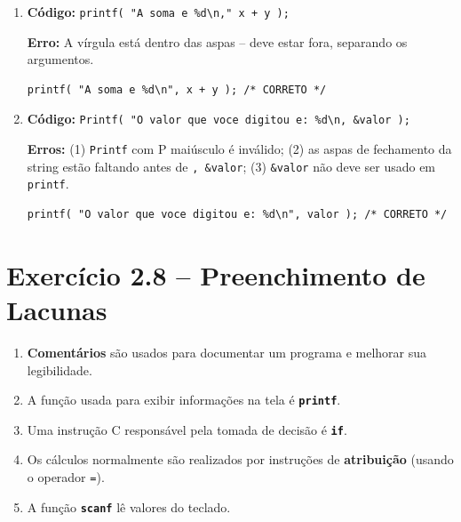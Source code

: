 \documentclass[12pt,a4paper]{article}
\begin{document}
\begin{respostabox}
\begin{enumerate}[label=\textbf{\alph*)}]
\item \textbf{Código:} \texttt{printf( "A soma e \%d\textbackslash n," x + y );}

\textbf{Erro:} A vírgula está dentro das aspas -- deve estar fora, separando os argumentos.
\begin{lstlisting}
printf( "A soma e %d\n", x + y ); /* CORRETO */
\end{lstlisting}

\item \textbf{Código:} \texttt{Printf( "O valor que voce digitou e: \%d\textbackslash n, \&valor );}

\textbf{Erros:} (1) \texttt{Printf} com P maiúsculo é inválido; (2) as aspas de fechamento da string estão faltando antes de \texttt{, \&valor}; (3) \texttt{\&valor} não deve ser usado em \texttt{printf}.
\begin{lstlisting}
printf( "O valor que voce digitou e: %d\n", valor ); /* CORRETO */
\end{lstlisting}

\end{enumerate}
\end{respostabox}

\section{Exercício 2.8 -- Preenchimento de Lacunas}

\begin{respostabox}[title={Exercício 2.8 -- Respostas}]
\begin{enumerate}[label=\textbf{\alph*)}]
  \item \textbf{Comentários} são usados para documentar um programa e melhorar sua legibilidade.
  \item A função usada para exibir informações na tela é \textbf{\texttt{printf}}.
  \item Uma instrução C responsável pela tomada de decisão é \textbf{\texttt{if}}.
  \item Os cálculos normalmente são realizados por instruções de \textbf{atribuição} (usando o operador \texttt{=}).
  \item A função \textbf{\texttt{scanf}} lê valores do teclado.
\end{enumerate}
\end{respostabox}

\end{document}
